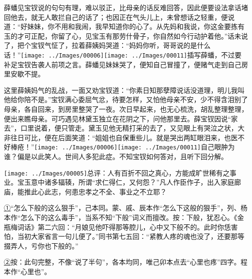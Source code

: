 薛蟠见宝钗说的句句有理，难以驳正，比母亲的话反难回答，因此便要设法拿话堵回他去，就无人敢拦自己的话了；也因正在气头儿上，未曾想话之轻重，便说道：``好妹妹，你不用和我闹，我早知道你的心了。从先妈和我说，你这金要拣有玉的才可正配，你留了心，见宝玉有那劳什骨子，你自然如今行动护着他。''话未说了，把个宝钗气怔了，拉着薛姨妈哭道：``妈妈你听，哥哥说的是什么话！''{\texttt{[image: ../Images/00006]}\texttt{[image: ../Images/00011]}\footnotesize \kaishu 插写薛蟠，不过要补足宝钗告袭人前项之言。}薛蟠见妹妹哭了，便知自己冒撞了，便赌气走到自己房里安歇不提。

这里薛姨妈气的乱战，一面又劝宝钗道：``你素日知那孽障说话没道理，明儿我叫他给你陪不是。''宝钗满心委屈气忿，待要怎样，又怕他母亲不安，少不得含泪别了母亲，各自回来，到房里整哭了一夜。次日早起来，也无心梳洗，胡乱整理整理，便出来瞧母亲。可巧遇见林黛玉独立在花阴之下，问他那里去。薛宝钗因说``家去''，口里说着，便只管走。黛玉见他无精打采的去了，又见眼上有哭泣之状，大非往日可比，便在后面笑道：``姐姐也自保重些儿。就是哭出两缸眼泪来，也医不好棒疮！''{\texttt{[image: ../Images/00006]}\texttt{[image: ../Images/00011]}\footnotesize \kaishu 自己眼肿为谁？偏是以此笑人。世间人多犯此症。}不知宝钗如何答对，且听下回分解。

{\texttt{[image: ../Images/00005]}总评：人有百折不回之真心，方能成旷世稀有之事业。宝玉意中诸多辐辏，所谓``求仁得仁，又何怨？''凡人作臣作子，出入家庭廊庙，能推此心此志，何患忠孝之不全、事业之不立耶？}

{\href{../Text/part0038_split_000.html\#navto_1_a}{①}``怎么下般的这么狠手''，己本同。蒙、戚、辰本作``怎么下这般的狠手''，列、杨本作``怎么下的这么毒手''，当系不知``下般''词义而擅改。按：下般，犹忍心。《金瓶梅词话》第二六回：``月娘见他吓得那等腔儿，心中又下般不的。此时你恁害怕，当初大家省言一句儿便了。''同书第七五回：``紧教人疼的魂也没了，还要那等掇弄人，亏你也下般的。''}

{\href{../Text/part0038_split_000.html\#navto_2_a}{②}按：此句完整，不像``说了半句''，各本均同，唯己卯本点去``心里也疼''四字。程本作``心里也''。}

